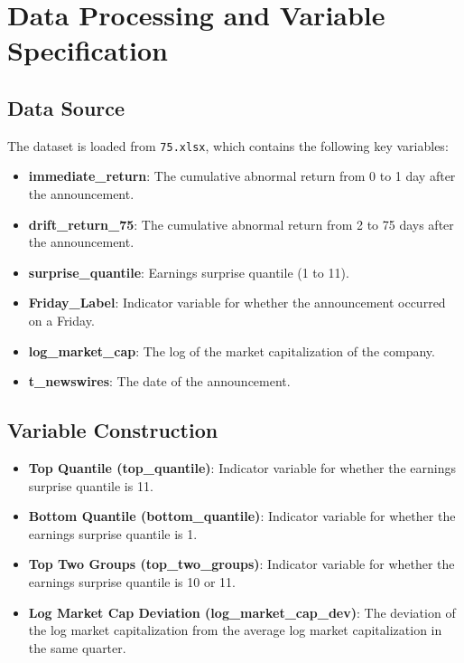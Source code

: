 \documentclass{article}
\begin{document}
\section*{Data Processing and Variable Specification}

\subsection*{Data Source}
The dataset is loaded from \texttt{75.xlsx}, which contains the following key variables:
\begin{itemize}
    \item \textbf{immediate\_return}: The cumulative abnormal return from 0 to 1 day after the announcement.
    \item \textbf{drift\_return\_75}: The cumulative abnormal return from 2 to 75 days after the announcement.
    \item \textbf{surprise\_quantile}: Earnings surprise quantile (1 to 11).
    \item \textbf{Friday\_Label}: Indicator variable for whether the announcement occurred on a Friday.
    \item \textbf{log\_market\_cap}: The log of the market capitalization of the company.
    \item \textbf{t\_newswires}: The date of the announcement.
\end{itemize}

\subsection*{Variable Construction}
\begin{itemize}
    \item \textbf{Top Quantile (top\_quantile)}: Indicator variable for whether the earnings surprise quantile is 11.
    \item \textbf{Bottom Quantile (bottom\_quantile)}: Indicator variable for whether the earnings surprise quantile is 1.
    \item \textbf{Top Two Groups (top\_two\_groups)}: Indicator variable for whether the earnings surprise quantile is 10 or 11.
    \item \textbf{Log Market Cap Deviation (log\_market\_cap\_dev)}: The deviation of the log market capitalization from the average log market capitalization in the same quarter.
\end{itemize}
\end{document}
